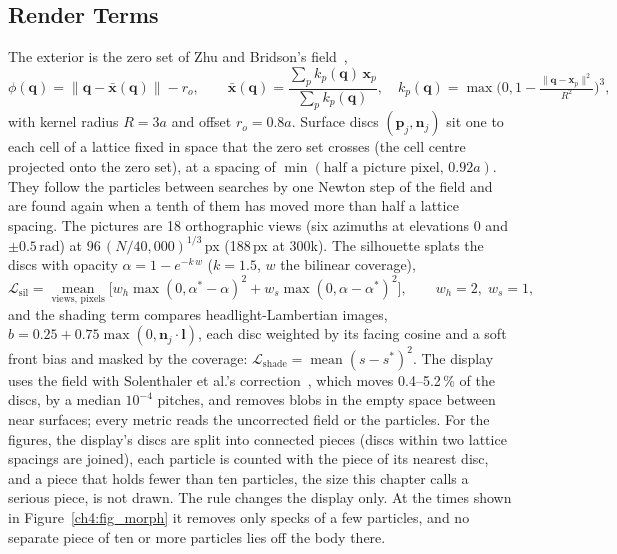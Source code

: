 \subsection{Render Terms}
\label{app:ch4_render}
The exterior is the zero set of Zhu and Bridson's field~\citep{10.1145/1073204.1073298},
\begin{equation}
\phi(\mathbf{q})=\lVert\mathbf{q}-\bar{\mathbf{x}}(\mathbf{q})\rVert-r_o,\qquad
\bar{\mathbf{x}}(\mathbf{q})=\frac{\sum_p k_p(\mathbf{q})\,\mathbf{x}_p}{\sum_p k_p(\mathbf{q})},\quad
k_p(\mathbf{q})=\max\!\Big(0,1-\tfrac{\lVert\mathbf{q}-\mathbf{x}_p\rVert^2}{R^2}\Big)^{3},
\end{equation}
with kernel radius $R=3a$ and offset $r_o=0.8a$. Surface discs $(\mathbf{p}_j,\mathbf{n}_j)$ sit one to each cell of a
lattice fixed in space that the zero set crosses (the cell centre projected onto the zero set), at a spacing of
$\min(\text{half a picture pixel},\,0.92a)$. They follow the particles between searches by one Newton step of the field and
are found again when a tenth of them has moved more than half a lattice spacing. The pictures are 18 orthographic views
(six azimuths at elevations $0$ and $\pm0.5$\,rad) at $96\,(N/40{,}000)^{1/3}$\,px (188\,px at 300k). The silhouette
splats the discs with opacity $\alpha=1-e^{-k\,w}$ ($k=1.5$, $w$ the bilinear coverage),
\begin{equation}
\mathcal{L}_{\mathrm{sil}}=\operatorname*{mean}_{\text{views, pixels}}\Big[w_h\max(0,\alpha^\ast-\alpha)^2
 +w_s\max(0,\alpha-\alpha^\ast)^2\Big],\qquad w_h=2,\;w_s=1 ,
\end{equation}
and the shading term compares headlight-Lambertian images, $b=0.25+0.75\max(0,\mathbf{n}_j\cdot\mathbf{l})$, each disc
weighted by its facing cosine and a soft front bias and masked by the coverage:
$\mathcal{L}_{\mathrm{shade}}=\operatorname{mean}(s-s^\ast)^2$. The display uses the field with Solenthaler et al.'s
correction~\citep{solenthaler2007unified}, which moves 0.4--5.2\,\% of the discs, by a median $10^{-4}$ pitches, and removes
blobs in the empty space between near surfaces; every metric reads the uncorrected field or the particles. For the figures,
the display's discs are split into connected pieces (discs within two lattice spacings are joined), each particle is counted
with the piece of its nearest disc, and a piece that holds fewer than ten particles, the size this chapter calls a serious
piece, is not drawn. The rule changes the display only. At the times shown in Figure~\ref{ch4:fig_morph} it removes only
specks of a few particles, and no separate piece of ten or more particles lies off the body there.

